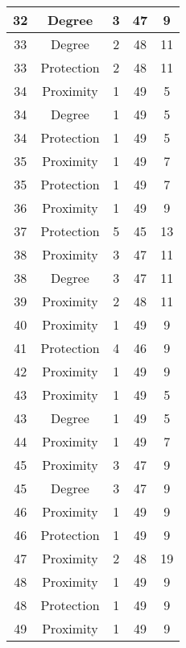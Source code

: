 \documentclass[results.tex]{subfiles}
\begin{document}
\begin{center}
\begin{tabular}{| c || c | c | c | c |}
    32 & Degree & 3 & 47 & 9 \\ 
    \hline
    33 & Degree & 2 & 48 & 11 \\ 
    \hline
    33 & Protection & 2 & 48 & 11 \\ 
    \hline
    34 & Proximity & 1 & 49 & 5 \\ 
    \hline
    34 & Degree & 1 & 49 & 5 \\ 
    \hline
    34 & Protection & 1 & 49 & 5 \\ 
    \hline
    35 & Proximity & 1 & 49 & 7 \\ 
    \hline
    35 & Protection & 1 & 49 & 7 \\ 
    \hline
    36 & Proximity & 1 & 49 & 9 \\ 
    \hline
    37 & Protection & 5 & 45 & 13 \\ 
    \hline
    38 & Proximity & 3 & 47 & 11 \\ 
    \hline
    38 & Degree & 3 & 47 & 11 \\ 
    \hline
    39 & Proximity & 2 & 48 & 11 \\ 
    \hline
    40 & Proximity & 1 & 49 & 9 \\ 
    \hline
    41 & Protection & 4 & 46 & 9 \\ 
    \hline
    42 & Proximity & 1 & 49 & 9 \\ 
    \hline
    43 & Proximity & 1 & 49 & 5 \\ 
    \hline
    43 & Degree & 1 & 49 & 5 \\ 
    \hline
    44 & Proximity & 1 & 49 & 7 \\ 
    \hline
    45 & Proximity & 3 & 47 & 9 \\ 
    \hline
    45 & Degree & 3 & 47 & 9 \\ 
    \hline
    46 & Proximity & 1 & 49 & 9 \\ 
    \hline
    46 & Protection & 1 & 49 & 9 \\ 
    \hline
    47 & Proximity & 2 & 48 & 19 \\ 
    \hline
    48 & Proximity & 1 & 49 & 9 \\ 
    \hline
    48 & Protection & 1 & 49 & 9 \\ 
    \hline
    49 & Proximity & 1 & 49 & 9 \\ 
    \hline   \end{tabular}
\end{center}
\end{document}
